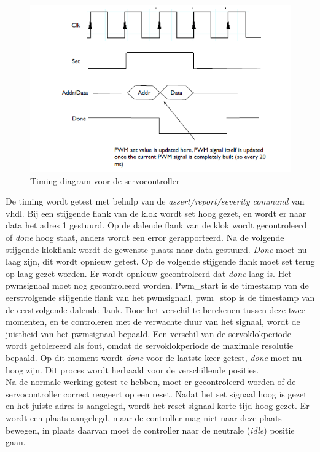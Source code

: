 \begin{figure}[H]
	\centering
	\includegraphics[width=\linewidth]{timing.png}
	\caption{Timing diagram voor de servocontroller}
	\label{fig:timing}
\end{figure}
\noindent
De timing wordt getest met behulp van de \textit{assert/report/severity command} van \gls{vhdl}. Bij een stijgende flank van de klok wordt set hoog gezet, en wordt er naar data het adres 1 gestuurd. Op de dalende flank van de klok wordt gecontroleerd of \textit{done} hoog staat, anders wordt een error gerapporteerd. Na de volgende stijgende klokflank wordt de gewenste plaats naar data gestuurd. \textit{Done} moet nu laag zijn, dit wordt opnieuw getest. Op de volgende stijgende flank moet set terug op laag gezet worden. Er wordt opnieuw gecontroleerd dat \textit{done} laag is. Het \gls{pwm}signaal moet nog gecontroleerd worden. Pwm\_start is de timestamp van de eerstvolgende stijgende flank van het \gls{pwm}signaal, pwm\_stop is de timestamp van de eerstvolgende dalende flank. Door het verschil te berekenen tussen deze twee momenten, en te controleren met de verwachte duur van het signaal, wordt de juistheid van het \gls{pwm}signaal bepaald. Een verschil van de servoklokperiode wordt getolereerd als fout, omdat de servoklokperiode de maximale resolutie bepaald. Op dit moment wordt \textit{done} voor de laatste keer getest, \textit{done} moet nu hoog zijn. Dit proces wordt herhaald voor de verschillende posities.    \\

Na de normale werking getest te hebben, moet er gecontroleerd worden of de servocontroller correct reageert op een reset. Nadat het set signaal hoog is gezet en het juiste adres is aangelegd, wordt het reset signaal korte tijd hoog gezet. Er wordt een plaats aangelegd, maar de controller mag niet naar deze plaats bewegen, in plaats daarvan moet de controller naar de neutrale (\textit{idle}) positie gaan.

